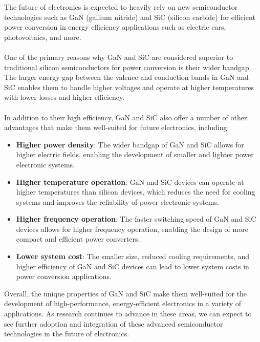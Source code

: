 The future of electronics is expected to heavily rely on new semiconductor technologies such as GaN (gallium nitride) and SiC (silicon carbide) for efficient power conversion in energy efficiency applications such as electric cars, photovoltaics, and more.\\\\
One of the primary reasons why GaN and SiC are considered superior to traditional silicon semiconductors for power conversion is their wider bandgap. The larger energy gap between the valence and conduction bands in GaN and SiC enables them to handle higher voltages and operate at higher temperatures with lower losses and higher efficiency.\\\\
In addition to their high efficiency, GaN and SiC also offer a number of other advantages that make them well-suited for future electronics, including:
\begin{itemize}
    \item \textbf{Higher power density}: The wider bandgap of GaN and SiC allows for higher electric fields, enabling the development of smaller and lighter power electronic systems.
    \item \textbf{Higher temperature operation}: GaN and SiC devices can operate at higher temperatures than silicon devices, which reduces the need for cooling systems and improves the reliability of power electronic systems.
    \item \textbf{Higher frequency operation}: The faster switching speed of GaN and SiC devices allows for higher frequency operation, enabling the design of more compact and efficient power converters.
    \item \textbf{Lower system cost}: The smaller size, reduced cooling requirements, and higher efficiency of GaN and SiC devices can lead to lower system costs in power conversion applications.
\end{itemize}
Overall, the unique properties of GaN and SiC make them well-suited for the development of high-performance, energy-efficient electronics in a variety of applications. As research continues to advance in these areas, we can expect to see further adoption and integration of these advanced semiconductor technologies in the future of electronics.